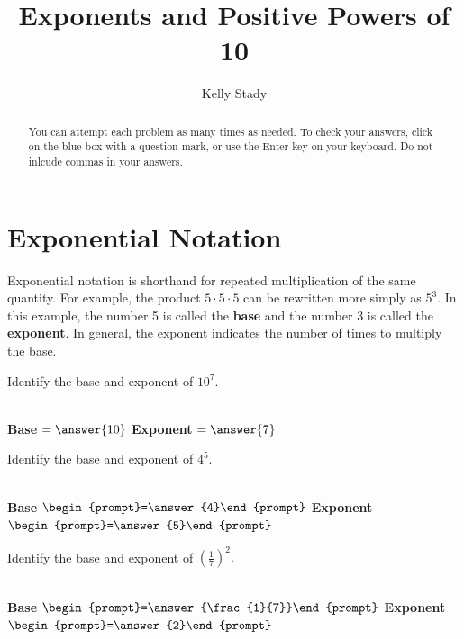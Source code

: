 \documentclass{ximera}
\title{Exponents and Positive Powers of 10}   %
\author{Kelly Stady}
\begin{document}
\begin{abstract}
You can attempt each problem as many times as needed. To check your answers, click on the 
blue box with a question mark, or use the Enter key on your keyboard.  Do not inlcude commas in your answers.
\end{abstract}

\maketitle
\label{xim:ExponentsPowers10Activity}


\section*{Exponential Notation}

Exponential notation is shorthand for repeated multiplication of
the same quantity. For example, the product $5 \cdot 5 \cdot 5$ can be rewritten more simply
as $5^3.$  In this example, the number 5 is called the
\textbf{base} and the number 3 is called the \textbf{exponent}. In
general, the exponent indicates the number of times to multiply
the base.


\begin{question} Identify the base and exponent of $10^7.$

~ \\[3em]  %

\hspace{2in} \textbf{Base} $=\answer{10}$  \hspace{1in}  \textbf{Exponent} $=\answer{7}$

\end{question}


\begin{question} Identify the base and exponent of $4^5.$

~ \\[3em]  %

\hspace{2in} \textbf{Base} $\begin{prompt}=\answer{4}\end{prompt}$  \hspace{1in}  \textbf{Exponent} $\begin{prompt}=\answer{5}\end{prompt}$

\end{question}

\begin{question} Identify the base and exponent of $\displaystyle \left(\frac{1}{7} \right)^2.$

 ~ \\[3em]  %

\hspace{2in} \textbf{Base} $\begin{prompt}=\answer{\frac{1}{7}}\end{prompt}$  \hspace{1in}  \textbf{Exponent} $\begin{prompt}=\answer{2}\end{prompt}$

\end{question}
\end{document}
